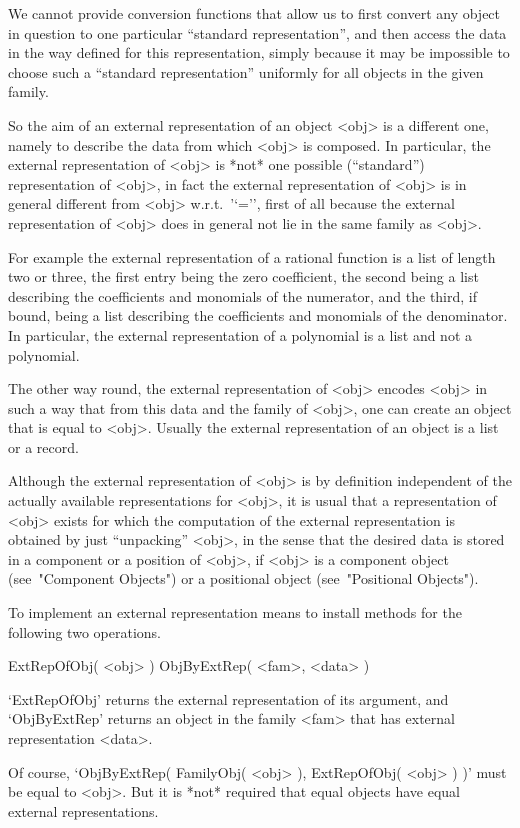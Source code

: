 We cannot provide conversion functions that allow us to first convert
any object in question to one particular ``standard representation'',
and then access the data in the way defined for this representation,
simply because it may be impossible to choose such a ``standard
representation'' uniformly for all objects in the given family.

So the aim of an external representation of an object <obj> is a
different one, namely to describe the data from which <obj> is composed.
In particular, the external representation of <obj> is *not* one possible
(``standard'') representation of <obj>,
in fact the external representation of <obj> is in general different
from <obj> w.r.t.~'`='',
first  of all because the external representation of <obj> does in general
not lie in the same family as <obj>.

For example the external representation of a rational function is a list
of length two or three, the first entry being the zero coefficient,
the second being a list describing the coefficients and monomials of the
numerator, and the third, if bound, being a list describing the coefficients
and monomials of the denominator.
In particular, the external representation of a polynomial is a list
and not a polynomial.

The other way round, the external representation of <obj> encodes <obj>
in such a way that from this data and the family of <obj>,
one can create an object that is equal to <obj>.
Usually the external representation of an object is a list or a record.

Although the external representation of <obj> is by definition independent
of the actually available representations for <obj>,
it is usual that a representation of <obj> exists for which the
computation of the external representation is obtained by just
``unpacking'' <obj>,
in the sense that the desired data is stored in a component or a position
of <obj>, if <obj> is a component object (see~"Component Objects")
or a positional object (see~"Positional Objects").

To implement an external representation means to install methods for the
following two operations.

\>ExtRepOfObj( <obj> )
\>ObjByExtRep( <fam>, <data> )

`ExtRepOfObj' returns the external representation of its argument,
and `ObjByExtRep' returns an object in the family <fam> that has
external representation <data>.

Of course, `ObjByExtRep( FamilyObj( <obj> ), ExtRepOfObj( <obj> ) )'
must be equal to <obj>.
But it is *not* required that equal objects have equal external
representations.

